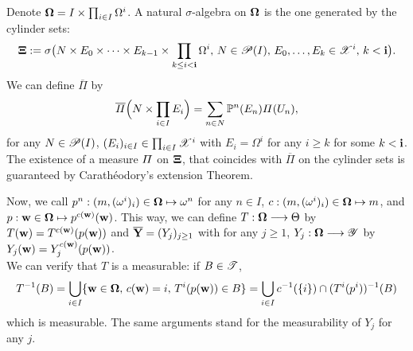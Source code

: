 Denote $\mathbf{\Omega}= I \times\prod_{i\in I}\Omega^i$. A natural $\sigma$-algebra on $\mathbf{\Omega}$ is the one generated by the cylinder sets:
\begin{equation}
    \mathbf{\Xi} := \sigma\big(N\times E_0\times\dots\times E_{k-1}\times\prod_{k\leq i<\mathbf{i}}\Omega^i,\,N\in\mathscr{P}(I),\, E_0,\dots,E_k\in\mathscr{X}^i,\,k<\mathbf{i} \big).
\end{equation}
We can define $\overline\varPi$ by
    \begin{equation}
        \overline\varPi\Big(N\times\prod_{i\in I}E_i\Big) = \sum_{n\in N}\mathbb{P}^n(E_n)\varPi(U_n),
    \end{equation}
for any $N\in\mathscr{P}(I)$, $(E_i)_{i \in I} \in\prod_{i\in I}\mathscr{X}^i$ with $E_i=\Omega^i$ for any $i\geq k$ for some $k<\mathbf{i}$. 
The existence of a measure $\mathbf{\varPi}$ on $\mathbf{\Xi}$, that coincides with $\overline\varPi$ on the cylinder sets is guaranteed by  Carathéodory's extension Theorem. %




Now, we call $p^n:(m,(\omega^i)_i)\in\mathbf{\Omega}\mapsto \omega^n$ for any $n\in I$, $c:(m,(\omega^i)_i)\in\mathbf{\Omega}\mapsto m$, and $p:\mathbf{w}\in\mathbf{\Omega}\mapsto p^{c(\mathbf{w})}(\mathbf{w})$.
This way, we can define $T:\mathbf{\Omega}\longrightarrow\Theta$ by $T(\mathbf{w})=T^{c(\mathbf{w})}(p(\mathbf{w}))$ and $\overline{\mathbf{Y}}=(Y_j)_{j\geq1}$ with for any $j\geq1$, $Y_j:\mathbf{\Omega}\longrightarrow\mathscr{Y}$ by $Y_j(\mathbf{w})=Y_j^{c(\mathbf{w})}(p(\mathbf{w}))$.\\
We can verify that $T$ is a measurable: if $B\in\mathscr{T}$,  
    \begin{equation}
        T^{-1}(B) = \bigcup_{i\in I}\{\mathbf{w}\in\mathbf{\Omega},\, c(\mathbf{w})=i,\,T^i(p(\mathbf{w}))\in B  \} = \bigcup_{i\in I}c^{-1}(\{i\})\cap (T^i(p^i))^{-1}(B)
    \end{equation}
which is measurable. 
The same arguments stand for the measurability of $Y_j$ for any $j$.







